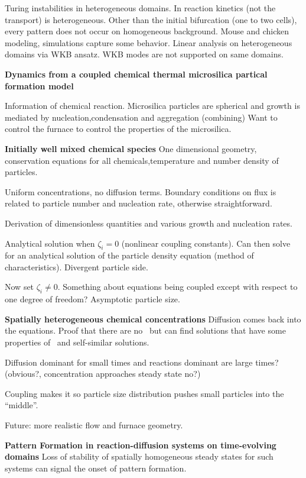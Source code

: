 \begin{description}
{\begin{description}
Turing instabilities in heterogeneous domains.
In reaction kinetics (not the transport)
is heterogeneous. Other than the initial
bifurcation (one to two cells), every pattern
does not occur on homogeneous background. Mouse
and chicken modeling, simulations capture some
behavior. Linear analysis on heterogeneous domains
via WKB ansatz. WKB modes are not supported on
same domains.

\item[Raquel Gonzalez Farina]
\textbf{Dynamics from a coupled chemical thermal
microsilica partical formation model}

Information of chemical reaction.
Microsilica particles are spherical and growth
is mediated by nucleation,condensation and aggregation (combining)
Want to control the furnace to control the properties of the
microsilica.

\textbf{Initially well mixed chemical species}
One dimensional geometry, conservation equations
for all chemicals,temperature and number density of particles.

Uniform concentrations, no diffusion terms. Boundary
conditions on flux is related to particle number and
nucleation rate, otherwise straightforward.

Derivation of dimensionless quantities and various
growth and nucleation rates.

Analytical solution when $\zeta_i=0$ (nonlinear
coupling constants). Can then solve for an
analytical solution of the particle
density equation (method of characteristics).
Divergent particle side.

Now set $\zeta_i\neq 0$. Something about
equations being coupled except with respect
to one degree of freedom? Asymptotic particle size.

\textbf{Spatially heterogeneous chemical concentrations}
Diffusion
comes back into the equations. Proof that there are
no \reqva\ but can find solutions that have some
properties of \reqva\ and self-similar solutions.

Diffusion dominant for small times and reactions
dominant are large times? (obvious?, concentration
approaches steady state no?)

Coupling makes it so particle size distribution
pushes small particles into the ``middle''.

Future: more realistic flow and furnace geometry.

\item[Robert Van Gorder]
\textbf{Pattern Formation in reaction-diffusion systems
 on time-evolving domains}
Loss of stability of spatially homogeneous steady states for
such systems can signal the onset of pattern formation.


\end{description}}
\end{description}
